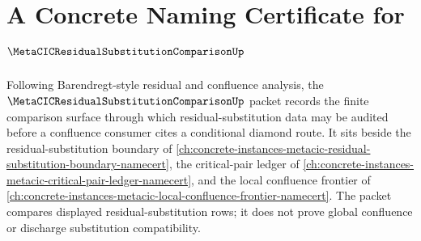 \chapter{A Concrete Naming Certificate for $\MetaCICResidualSubstitutionComparisonUp$}
\label{ch:concrete-instances-metacic-residual-substitution-comparison-namecert}

Following Barendregt-style residual and confluence analysis, the $\MetaCICResidualSubstitutionComparisonUp$ packet records the finite comparison surface through which residual-substitution data may be audited before a confluence consumer cites a conditional diamond route. It sits beside the residual-substitution boundary of \autoref{ch:concrete-instances-metacic-residual-substitution-boundary-namecert}, the critical-pair ledger of \autoref{ch:concrete-instances-metacic-critical-pair-ledger-namecert}, and the local confluence frontier of \autoref{ch:concrete-instances-metacic-local-confluence-frontier-namecert}. The packet compares displayed residual-substitution rows; it does not prove global confluence or discharge substitution compatibility.

